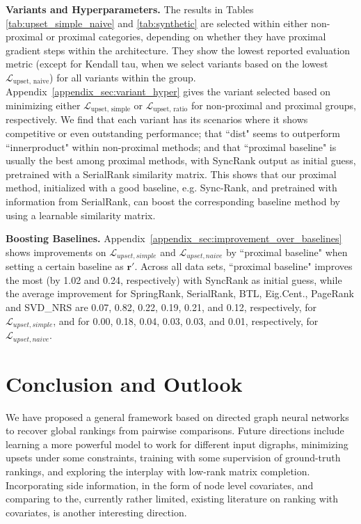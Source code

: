 \documentclass[nohyperref]{article}
\theoremstyle{plain}
\theoremstyle{definition}
\theoremstyle{remark}
\begin{document}

\textbf{Variants and Hyperparameters.} 
The results
in Tables \ref{tab:upset_simple_naive} and \ref{tab:synthetic} are selected within either non-proximal or proximal categories, depending on whether they have proximal gradient steps within the architecture. They show
the lowest reported evaluation metric (except for Kendall tau,
when we select variants based on the lowest $\mathcal{L}_\text{upset, naive}$) for all variants within the group. 
Appendix~\ref{appendix_sec:variant_hyper} gives
the variant selected based on minimizing either $\mathcal{L}_\text{upset, simple}$ or $\mathcal{L}_\text{upset, ratio}$ for non-proximal and proximal groups, respectively. We find that each variant has its scenarios where it shows competitive or even outstanding performance;  that ``dist" seems to outperform ``innerproduct" within non-proximal methods; and that ``proximal baseline" is usually the best among proximal methods, with SyncRank output as initial guess, pretrained with a SerialRank similarity matrix. This shows
that our proximal method, initialized
with a good baseline, e.g. Sync-Rank, and pretrained with information from SerialRank, can boost the corresponding baseline method
by using a learnable similarity matrix.

\textbf{Boosting Baselines.} 
Appendix~\ref{appendix_sec:improvement_over_baselines} shows improvements on $\mathcal{L}_{upset, simple}$ and $\mathcal{L}_{upset, naive}$ by ``proximal baseline" when setting a certain baseline as $\mathbf{r}'$. Across all data sets, ``proximal baseline" improves the most (by 1.02 and 0.24, respectively) with SyncRank as initial guess,
while the average improvement for SpringRank, SerialRank, BTL, Eig.Cent., PageRank and SVD\_NRS are 0.07, 0.82, 0.22, 0.19, 0.21, and 0.12, respectively, for $\mathcal{L}_{upset, simple}$, and for 0.00, 0.18, 0.04, 0.03, 0.03, and 0.01, respectively, for $\mathcal{L}_{upset, naive}$.
\section{Conclusion and Outlook}
We have proposed a general framework based on directed graph neural networks to recover global rankings from pairwise comparisons. Future directions include  learning a more powerful model to work for different input digraphs, minimizing upsets under some constraints, training with some supervision of ground-truth rankings, and exploring the interplay with low-rank matrix completion. Incorporating side information, in the form of node level covariates, and comparing to the, currently rather limited, existing literature on ranking with covariates, is another interesting direction. 
\end{document}
